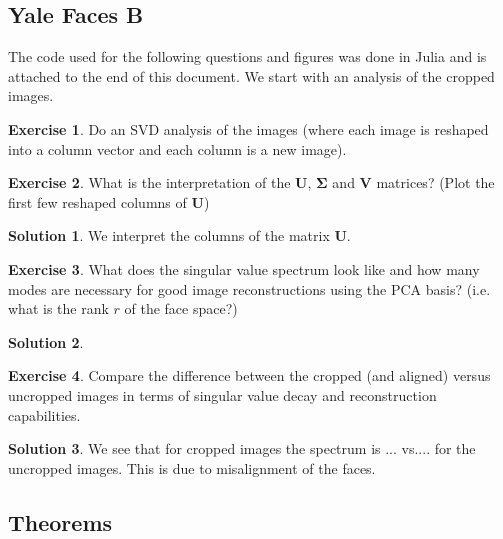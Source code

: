 \documentclass[12pt]{article}
\renewcommand{\vec}[1]{\mathbf{#1}}
\theoremstyle{definition}
\newtheorem{exer}{Exercise}
\newtheorem{sol}{Solution}
\theoremstyle{remark}
\begin{document}
\subsection*{Yale Faces B}%
\label{sub:yale_faces_b}

The code used for the following questions and figures was done in Julia and is attached to the end of this document. We start with an analysis of the cropped images.
\begin{exer}
Do an SVD analysis of the images (where each image is reshaped into a column vector and each column is a new image).
\end{exer}

\begin{exer}
    What is the interpretation of the $\vec{U}$, $\vec{\Sigma}$ and $\vec{V}$ matrices? (Plot the first few reshaped columns of $\vec{U}$)
\end{exer}
\begin{sol}
    We interpret the columns of the matrix $\vec{U}$. 
\end{sol}
\begin{exer}
What does the singular value spectrum look like and how many modes are necessary for good image
reconstructions using the PCA basis? (i.e. what is the rank $r$ of the face space?)
\end{exer}
\begin{sol}
    
\end{sol}
\begin{exer}
Compare the difference between the cropped (and aligned) versus uncropped images in terms of singular
value decay and reconstruction capabilities.
\end{exer}
\begin{sol}
We see that for cropped images the spectrum is ... vs.... for the uncropped images. This is due to misalignment of the faces.
\end{sol}
\newpage

\subsection*{Theorems}%
\label{sub:theorems}
\end{document}
